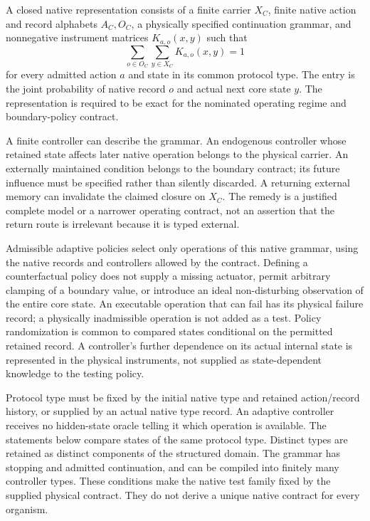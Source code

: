 \begin{definition}
\label{def:spc2-native-instrument}
A closed native representation consists of a finite carrier $X_C$,
finite native action and record alphabets $A_C,O_C$, a physically
specified continuation grammar, and nonnegative instrument matrices
$K_{a,o}(x,y)$ such that
\[
 \sum_{o\in O_C}\sum_{y\in X_C}K_{a,o}(x,y)=1
\]
for every admitted action $a$ and state in its common protocol type.
The entry is the joint probability of native record $o$ and actual
next core state $y$. The representation is required to be exact for
the nominated operating regime and boundary-policy contract.
\end{definition}

A finite controller can describe the grammar. An endogenous controller
whose retained state affects later native operation belongs to the
physical carrier. An externally maintained condition belongs to the
boundary contract; its future influence must be specified rather than
silently discarded. A returning external memory can invalidate the
claimed closure on $X_C$. The remedy is a justified complete model or
a narrower operating contract, not an assertion that the return route
is irrelevant because it is typed external.

Admissible adaptive policies select only operations of this native
grammar, using the native records and controllers allowed by the
contract. Defining a counterfactual policy does not supply a missing
actuator, permit arbitrary clamping of a boundary value, or introduce
an ideal non-disturbing observation of the entire core state. An
executable operation that can fail has its physical failure record;
a physically inadmissible operation is not added as a test.
Policy randomization is common to compared states conditional on the
permitted retained record. A controller's further dependence on its
actual internal state is represented in the physical instruments,
not supplied as state-dependent knowledge to the testing policy.

Protocol type must be fixed by the initial native type and retained action/record history, or supplied by an actual native type record. An adaptive controller receives no hidden-state oracle telling it which operation is available. The statements below compare states of the same protocol type.
Distinct types are retained as distinct components of the structured
domain. The grammar has stopping and admitted continuation, and can
be compiled into finitely many controller types. These conditions
make the native test family fixed by the supplied physical contract.
They do not derive a unique native contract for every organism.


